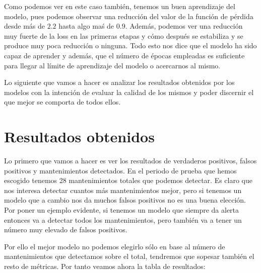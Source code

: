 Como podemos ver en este caso también, tenemos un buen aprendizaje del modelo, pues podemos observar una reducción del valor de la función de pérdida desde más de $2.2$ hasta algo maś de $0.9$. Además, podemos ver una reducción muy fuerte de la loss en las primeras etapas y cómo después se estabiliza y se produce muy poca reducción o ninguna. Todo esto nos dice que el modelo ha sido capaz de aprender y además, que el número de épocas empleadas es suficiente para llegar al límite de aprendizaje del modelo o acercarnos al mismo.

Lo siguiente que vamos a hacer es analizar los resultados obtenidos por los modelos con la intención de evaluar la calidad de los mismos y poder discernir el que mejor se comporta de todos ellos.

\section{Resultados obtenidos}

Lo primero que vamos a hacer es ver los resultados de verdaderos positivos, falsos positivos y mantenimientos detectados. En el periodo de prueba que hemos escogido tenemos 28 mantenimientos totales que podemos detectar. Es claro que nos interesa detectar cuantos más mantenimientos mejor, pero si tenemos un modelo que a cambio nos da muchos falsos positivos no es una buena elección. Por poner un ejemplo evidente, si tenemos un modelo que siempre da alerta entonces va a detectar todos los mantenimientos, pero también va a tener un número muy elevado de falsos positivos.

Por ello el mejor modelo no podemos elegirlo sólo en base al número de mantenimientos que detectamos sobre el total, tendremos que sopesar también el resto de métricas. Por tanto veamos ahora la tabla de resultados:

